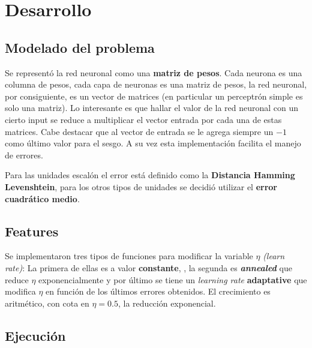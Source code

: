 \documentclass[%
    final,
    reprint,
    notitlepage,
    narroweqnarray,
    inline,
    twoside,
    invited
    ]{ieee}
\begin{document}

\section{Desarrollo}

\subsection{Modelado del problema}

\par Se representó la red neuronal como una \textbf{matriz de pesos}. Cada neurona es una columna de pesos, cada capa de 
neuronas es una matriz de pesos, la red neuronal, por consiguiente, es un vector de matrices (en particular un 
perceptrón simple es solo una matriz). Lo interesante es que hallar 
el valor de la red neuronal con un cierto input se reduce a multiplicar el vector entrada por cada una de estas matrices. Cabe destacar 
que al vector de entrada se le agrega siempre un $-1$ como último valor para el sesgo.
A su vez esta implementación facilita el manejo de errores.\\

\par Para las unidades escalón el error está definido como la \textbf{Distancia Hamming Levenshtein}, 
para los otros tipos de unidades se decidió utilizar el \textbf{error cuadrático medio}.

\subsection{Features}

\par Se implementaron tres tipos de funciones para modificar la variable $\eta$ \textit{(learn rate)}: 
La primera de ellas es a valor \textbf{constante}, , la segunda es \textbf{\textit{annealed}} que reduce $\eta$ exponencialmente y por último se 
tiene un \textit{learning rate} \textbf{adaptative} que modifica $\eta$ en función de los últimos errores obtenidos. El crecimiento es aritmético, con cota 
en $\eta =0.5$, la reducción exponencial.

\subsection{Ejecución}
\end{document}
